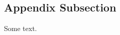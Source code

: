 \documentclass{article}
\begin{document}
\subsection*{Appendix Subsection}

Some text.







%
%
\end{document}
